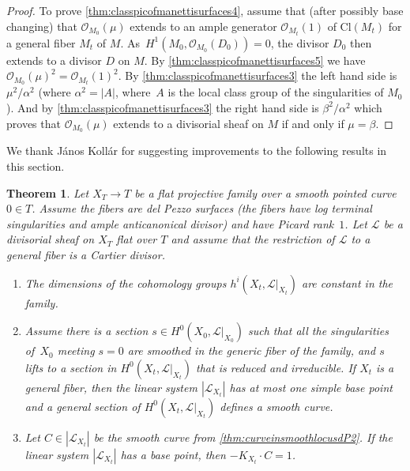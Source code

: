 \documentclass[JEP,XML,SOM,Unicode,NoFloatCountersInSection,published]{cedram}
\theoremstyle{plain}
\newtheorem{theorem}{Theorem}[section]
\theoremstyle{definition}
\newcommand\Lc{{\mathcal L}}
\newcommand\Oc{{\mathcal O}}
\newcommand\Cl{{\mathrm{Cl}}}
\begin{document}
\begin{proof}
To prove \eqref{thm:classpicofmanettisurfaces4}, assume that (after possibly base changing) that $\Oc_{M_0}(\mu)$ extends to an ample generator $\Oc_{M_t}(1)$ of $\Cl(M_t)$ for a general fiber $M_t$ of $M$.
As~$H^1(M_0, \Oc_{M_0}(D_0)) = 0$, the divisor $D_0$ then extends to a divisor $D$ on $M$. By \eqref{thm:classpicofmanettisurfaces5} we have $\Oc_{M_0}(\mu)^2 = \Oc_{M_t}(1)^2$. By \eqref{thm:classpicofmanettisurfaces3} the left hand side is $\mu^2/\alpha^2$ (where $\alpha^2 = |A|$, where~$A$ is the local class group of the singularities of $M_0$). And by \eqref{thm:classpicofmanettisurfaces3} the right hand side is $\beta^2/\alpha^2$ which proves that $\Oc_{M_0}(\mu)$ extends to a divisorial sheaf on $M$ if and only if $\mu = \beta$.
\end{proof}

We thank János Kollár for suggesting improvements to the following results in this section.

\begin{theorem}\label{thm:curveinsmoothlocusdP}
Let $X_T\to T$ be a flat projective family over a smooth pointed curve $0\in T$. Assume the fibers are del Pezzo surfaces (\ie the fibers have log terminal singularities and ample anticanonical divisor) and have Picard rank~$1$. Let $\Lc$ be a divisorial sheaf on $X_T$ flat over $T$ and assume that the restriction of $\Lc$ to a general fiber is a Cartier divisor.
\begin{enumerate}
\item\label{thm:curveinsmoothlocusdP1} The dimensions of the cohomology groups $h^i(X_t,\Lc|_{X_t})$ are constant in the family.
\item\label{thm:curveinsmoothlocusdP2} Assume there is a section $s\in H^0(X_0,\Lc|_{X_0})$ such that all the singularities of~$X_0$ meeting $s=0$ are smoothed in the generic fiber of the family, and $s$ lifts to a section in $H^0(X_t,\Lc|_{X_t})$ that is reduced and irreducible. If $X_t$ is a general fiber, then the linear system $|\Lc_{X_t}|$ has at most one simple base point and a general section of $H^0(X_t,\Lc|_{X_t})$ defines a smooth curve.
\item\label{thm:curveinsmoothlocusdP3} Let $C \in |\Lc_{X_t}| $ be the smooth curve from \eqref{thm:curveinsmoothlocusdP2}. If the linear system $|\Lc_{X_t}|$ has a base point, then $-K_{X_t}\cdot C = 1$.
\end{enumerate}
\end{theorem}
\end{document}
